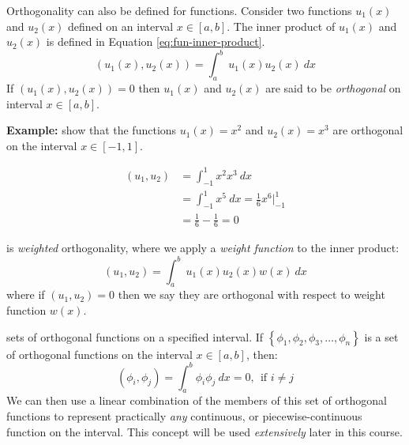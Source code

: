 Orthogonality can also be defined for functions. Consider two functions $u_1(x)$ and $u_2(x)$ defined on an interval $x\in[a,b]$.  The inner product of $u_1(x)$ and $u_2(x)$ is defined in Equation \ref{eq:fun-inner-product}.
\begin{equation}
\left(u_1(x),u_2(x)\right) = \int_{a}^{b} \ u_1(x)u_2(x) \ dx
\label{eq:fun-inner-product}
\end{equation}
If $\left(u_1(x),u_2(x)\right)=0$ then $u_1(x)$ and $u_2(x)$ are said to be \emph{orthogonal} on interval $x\in[a,b]$.

\vspace{0.5cm}

\noindent\textbf{Example:} show that the functions $u_1(x)=x^2$ and $u_2(x)=x^3$ are orthogonal on the interval $x \in[-1,1]$.

\vspace{0.5cm}

\begin{align*}
\left(u_1,u_2\right) &= \int_{-1}^{1} x^2 x^3 \ dx \\
&= \int_{-1}^1 x^5 \ dx = \frac{1}{6}x^6\Bigr|_{-1}^{1} \\
&=\frac{1}{6} - \frac{1}{6} = 0
\end{align*}

 is \emph{weighted} orthogonality, where we apply a \emph{weight function} to the inner product:
\begin{equation}
\left(u_1,u_2\right) = \int_a^b \ u_1(x)u_2(x)w(x) \ dx
\label{eq:weighted-inner-product}
\end{equation}
where if $\left(u_1,u_2\right)=0$ then we say they are orthogonal with respect to weight function $w(x)$.

 sets of orthogonal functions on a specified interval.  If $\left\{ \phi_1,\phi_2,\phi_3,\dots,\phi_n\right\}$ is a set of orthogonal functions on the interval $x\in[a,b]$, then:
\begin{equation*}
\left(\phi_i, \phi_j\right) = \int_{a}^{b} \phi_i \phi_j \ dx = 0, \ \ \text{if } i \ne j
\end{equation*}
We can then use a linear combination of the members of this set of orthogonal functions to represent practically \emph{any} continuous, or piecewise-continuous function on the interval.  This concept will be used \emph{extensively} later in this course.


